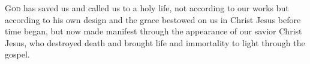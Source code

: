 
\lettrine{G}{od} has saved us and called us to a holy life, not according to our works but according to his own design and the grace bestowed on us in Christ Jesus before time began, but now made manifest through the appearance of our savior Christ Jesus, who destroyed death and brought life and immortality to light through the gospel.
